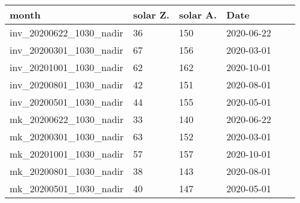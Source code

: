 \begin{tabular}{llllll}
\toprule
month                      & solar Z. & solar A. & Date       \\
\midrule
inv\_20200622\_1030\_nadir & 36           & 150           & 2020-06-22 \\
inv\_20200301\_1030\_nadir & 67           & 156           & 2020-03-01 \\
inv\_20201001\_1030\_nadir & 62           & 162           & 2020-10-01 \\
inv\_20200801\_1030\_nadir & 42           & 151           & 2020-08-01 \\
inv\_20200501\_1030\_nadir & 44           & 155           & 2020-05-01 \\
mk\_20200622\_1030\_nadir  & 33           & 140           & 2020-06-22 \\
mk\_20200301\_1030\_nadir  & 63           & 152           & 2020-03-01 \\
mk\_20201001\_1030\_nadir  & 57           & 157           & 2020-10-01 \\
mk\_20200801\_1030\_nadir  & 38           & 143           & 2020-08-01 \\
mk\_20200501\_1030\_nadir  & 40           & 147           & 2020-05-01 \\
\bottomrule
\end{tabular}